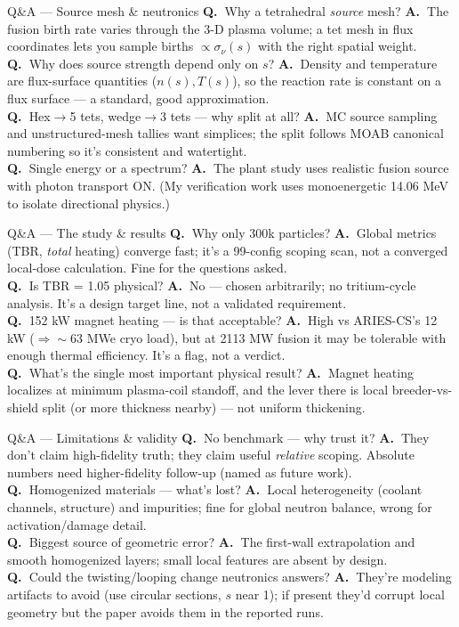 \documentclass[aspectratio=169]{beamer}
\newcommand{\q}[1]{\textbf{\color{key}Q.\ }#1}
\newcommand{\an}[1]{\textbf{A.\ }#1}
\begin{document}
\begin{frame}{Q\&A --- Source mesh \& neutronics}
  \small
  \q{Why a tetrahedral \emph{source} mesh?} \an{The fusion birth rate varies through the 3-D plasma volume; a tet mesh in flux coordinates lets you sample births $\propto \sigma_\nu(s)$ with the right spatial weight.}\\[2pt]
  \q{Why does source strength depend only on $s$?} \an{Density and temperature are flux-surface quantities ($n(s),T(s)$), so the reaction rate is constant on a flux surface --- a standard, good approximation.}\\[2pt]
  \q{Hex$\to$5 tets, wedge$\to$3 tets --- why split at all?} \an{MC source sampling and unstructured-mesh tallies want simplices; the split follows MOAB canonical numbering so it's consistent and watertight.}\\[2pt]
  \q{Single energy or a spectrum?} \an{The plant study uses realistic fusion source with photon transport ON. (My verification work uses monoenergetic 14.06 MeV to isolate directional physics.)}
\end{frame}

\begin{frame}{Q\&A --- The study \& results}
  \small
  \q{Why only 300k particles?} \an{Global metrics (TBR, \emph{total} heating) converge fast; it's a 99-config scoping scan, not a converged local-dose calculation. Fine for the questions asked.}\\[2pt]
  \q{Is TBR = 1.05 physical?} \an{No --- chosen arbitrarily; no tritium-cycle analysis. It's a design target line, not a validated requirement.}\\[2pt]
  \q{152 kW magnet heating --- is that acceptable?} \an{High vs ARIES-CS's 12 kW ($\Rightarrow \sim$63 MWe cryo load), but at 2113 MW fusion it may be tolerable with enough thermal efficiency. It's a flag, not a verdict.}\\[2pt]
  \q{What's the single most important physical result?} \an{Magnet heating localizes at minimum plasma-coil standoff, and the lever there is local breeder-vs-shield split (or more thickness nearby) --- not uniform thickening.}
\end{frame}

\begin{frame}{Q\&A --- Limitations \& validity}
  \small
  \q{No benchmark --- why trust it?} \an{They don't claim high-fidelity truth; they claim useful \emph{relative} scoping. Absolute numbers need higher-fidelity follow-up (named as future work).}\\[2pt]
  \q{Homogenized materials --- what's lost?} \an{Local heterogeneity (coolant channels, structure) and impurities; fine for global neutron balance, wrong for activation/damage detail.}\\[2pt]
  \q{Biggest source of geometric error?} \an{The first-wall extrapolation and smooth homogenized layers; small local features are absent by design.}\\[2pt]
  \q{Could the twisting/looping change neutronics answers?} \an{They're modeling artifacts to avoid (use circular sections, $s$ near 1); if present they'd corrupt local geometry but the paper avoids them in the reported runs.}
\end{frame}
\end{document}
